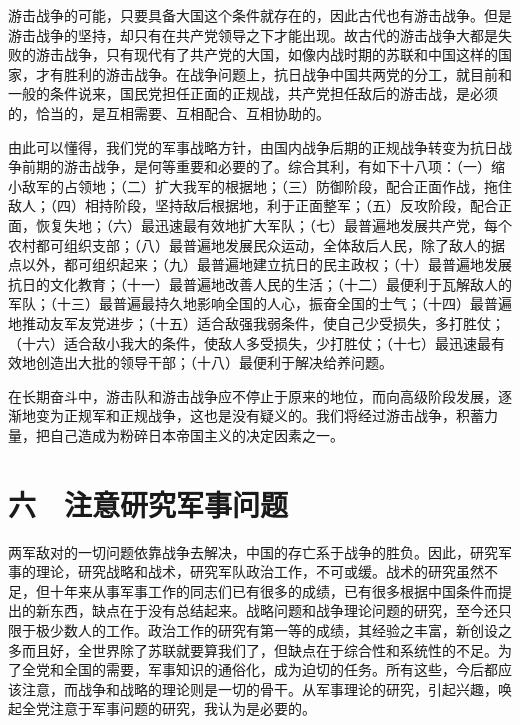 游击战争的可能，只要具备大国这个条件就存在的，因此古代也有游击战争。但是游击战争的坚持，却只有在共产党领导之下才能出现。故古代的游击战争大都是失败的游击战争，只有现代有了共产党的大国，如像内战时期的苏联和中国这样的国家，才有胜利的游击战争。在战争问题上，抗日战争中国共两党的分工，就目前和一般的条件说来，国民党担任正面的正规战，共产党担任敌后的游击战，是必须的，恰当的，是互相需要、互相配合、互相协助的。

由此可以懂得，我们党的军事战略方针，由国内战争后期的正规战争转变为抗日战争前期的游击战争，是何等重要和必要的了。综合其利，有如下十八项：（一）缩小敌军的占领地；（二）扩大我军的根据地；（三）防御阶段，配合正面作战，拖住敌人；（四）相持阶段，坚持敌后根据地，利于正面整军；（五）反攻阶段，配合正面，恢复失地；（六）最迅速最有效地扩大军队；（七）最普遍地发展共产党，每个农村都可组织支部；（八）最普遍地发展民众运动，全体敌后人民，除了敌人的据点以外，都可组织起来；（九）最普遍地建立抗日的民主政权；（十）最普遍地发展抗日的文化教育；（十一）最普遍地改善人民的生活；（十二）最便利于瓦解敌人的军队；（十三）最普遍最持久地影响全国的人心，振奋全国的士气；（十四）最普遍地推动友军友党进步；（十五）适合敌强我弱条件，使自己少受损失，多打胜仗；（十六）适合敌小我大的条件，使敌人多受损失，少打胜仗；（十七）最迅速最有效地创造出大批的领导干部；（十八）最便利于解决给养问题。

在长期奋斗中，游击队和游击战争应不停止于原来的地位，而向高级阶段发展，逐渐地变为正规军和正规战争，这也是没有疑义的。我们将经过游击战争，积蓄力量，把自己造成为粉碎日本帝国主义的决定因素之一。

\section{六　注意研究军事问题}

两军敌对的一切问题依靠战争去解决，中国的存亡系于战争的胜负。因此，研究军事的理论，研究战略和战术，研究军队政治工作，不可或缓。战术的研究虽然不足，但十年来从事军事工作的同志们已有很多的成绩，已有很多根据中国条件而提出的新东西，缺点在于没有总结起来。战略问题和战争理论问题的研究，至今还只限于极少数人的工作。政治工作的研究有第一等的成绩，其经验之丰富，新创设之多而且好，全世界除了苏联就要算我们了，但缺点在于综合性和系统性的不足。为了全党和全国的需要，军事知识的通俗化，成为迫切的任务。所有这些，今后都应该注意，而战争和战略的理论则是一切的骨干。从军事理论的研究，引起兴趣，唤起全党注意于军事问题的研究，我认为是必要的。


